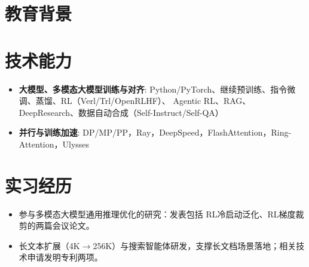 \documentclass{resume}
\begin{document}



\section{教育背景}

\section{技术能力}
\begin{itemize}[parsep=0.2ex]
  \item \textbf{大模型、多模态大模型训练与对齐}: Python/PyTorch、继续预训练、指令微调、蒸馏、RL（Verl/Trl/OpenRLHF）、 Agentic RL、RAG、DeepResearch、数据自动合成（Self-Instruct/Self-QA）
  \item \textbf{并行与训练加速}: DP/MP/PP，Ray，DeepSpeed，FlashAttention，Ring-Attention，Ulysses
\end{itemize}

\section{实习经历}
\begin{itemize}
  \item 参与多模态大模型通用推理优化的研究：发表包括 RL冷启动泛化、RL梯度裁剪的两篇会议论文。
\end{itemize}

\begin{itemize}
  \item 长文本扩展（4K$\rightarrow$256K）与搜索智能体研发，支撑长文档场景落地；相关技术申请发明专利两项。
\end{itemize}
\end{document}
